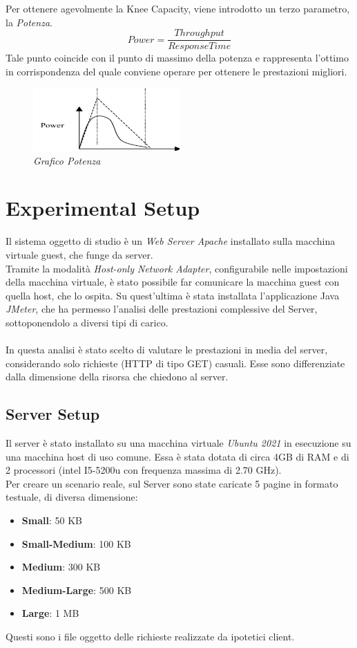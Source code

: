 Per ottenere agevolmente la Knee Capacity, viene introdotto un terzo parametro, la \textit{Potenza}. 
\\
\begin{equation}
	Power = \frac{Throughput}{Response Time}
\end{equation}
Tale punto coincide con il punto di massimo della potenza e rappresenta l'ottimo in corrispondenza del quale conviene operare per ottenere le prestazioni migliori.
\begin{figure}[H]
	\centering
	\includegraphics[width=0.5\textwidth]{img/hw2/Power.png}
	\caption{\textit{Grafico Potenza}}
\end{figure}


\section{Experimental Setup}
Il sistema oggetto di studio è un \textit{Web Server Apache} installato sulla macchina virtuale guest, che funge da server.
\\
Tramite la modalità \textit{Host-only Network Adapter}, configurabile nelle impostazioni della macchina virtuale, è stato possibile far comunicare la macchina guest con quella host, che lo ospita. Su quest'ultima è stata installata l'applicazione Java \textit{JMeter}, che ha permesso l'analisi delle prestazioni complessive del Server, sottoponendolo a diversi tipi di carico.
\\
\\
In questa analisi è stato scelto di valutare le prestazioni in media del server, considerando solo richieste (HTTP di tipo GET) casuali. Esse sono differenziate dalla dimensione della risorsa che chiedono al server. 

\subsection{Server Setup}
Il server è stato installato su una macchina virtuale \textit{Ubuntu 2021} in esecuzione su una macchina host di uso comune. Essa è stata dotata di circa 4GB di RAM e di 2 processori (intel I5-5200u con frequenza massima di 2.70 GHz).
\\Per creare un scenario reale, sul Server sono state caricate 5 pagine in formato testuale, di diversa dimensione:
\begin{itemize}
	\item \textbf{Small}: 50 KB
	\item \textbf{Small-Medium}: 100 KB
	\item \textbf{Medium}: 300 KB
	\item \textbf{Medium-Large}: 500 KB
	\item \textbf{Large}: 1 MB
\end{itemize}
Questi sono i file oggetto delle richieste realizzate da ipotetici client.

